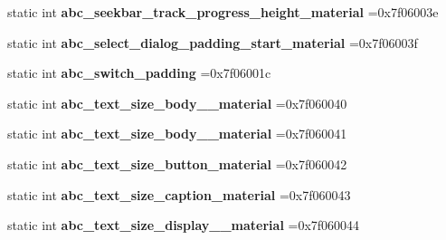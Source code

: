 \begin{DoxyCompactItemize}
\mbox{\label{classandroid_1_1support_1_1v4_1_1R_1_1dimen_a337857d337b25b2a3625264e435fc6a3}} 
static int {\bfseries abc\+\_\+seekbar\+\_\+track\+\_\+progress\+\_\+height\+\_\+material} =0x7f06003e
\item 
\mbox{\label{classandroid_1_1support_1_1v4_1_1R_1_1dimen_abd5536e0d92a41bfdd1712ac29676241}} 
static int {\bfseries abc\+\_\+select\+\_\+dialog\+\_\+padding\+\_\+start\+\_\+material} =0x7f06003f
\item 
\mbox{\label{classandroid_1_1support_1_1v4_1_1R_1_1dimen_a3ecc347df47bae8d390b4392b610ae5e}} 
static int {\bfseries abc\+\_\+switch\+\_\+padding} =0x7f06001c
\item 
\mbox{\label{classandroid_1_1support_1_1v4_1_1R_1_1dimen_aebba7ea0c067e50a0f9e0880a0ec0b8a}} 
static int {\bfseries abc\+\_\+text\+\_\+size\+\_\+body\+\_\+\_\+material} =0x7f060040
\item 
\mbox{\label{classandroid_1_1support_1_1v4_1_1R_1_1dimen_a8e33a9602d17d8a4b374e1f1bf485073}} 
static int {\bfseries abc\+\_\+text\+\_\+size\+\_\+body\+\_\+\_\+material} =0x7f060041
\item 
\mbox{\label{classandroid_1_1support_1_1v4_1_1R_1_1dimen_af5a9f5fe28b88b3bd11bc187a5853b60}} 
static int {\bfseries abc\+\_\+text\+\_\+size\+\_\+button\+\_\+material} =0x7f060042
\item 
\mbox{\label{classandroid_1_1support_1_1v4_1_1R_1_1dimen_aed33543344f97805542c7c2d9637f80b}} 
static int {\bfseries abc\+\_\+text\+\_\+size\+\_\+caption\+\_\+material} =0x7f060043
\item 
\mbox{\label{classandroid_1_1support_1_1v4_1_1R_1_1dimen_a9ada0b6fe23921293465d8faede4dfb2}} 
static int {\bfseries abc\+\_\+text\+\_\+size\+\_\+display\+\_\+\_\+material} =0x7f060044
\item 
\mbox{\label{classandroid_1_1support_1_1v4_1_1R_1_1dimen_a99d757aae3ebb1a16e735353d8f983a5}} 

\end{DoxyCompactItemize}
